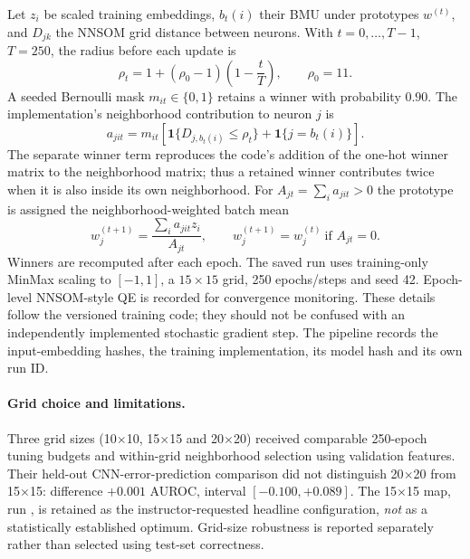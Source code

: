 \documentclass[11pt]{article}
\newcommand{\srcid}[1]{\texttt{\detokenize{#1}}}
\begin{document}
Let $z_i$ be scaled training embeddings, $b_t(i)$ their BMU under prototypes $w^{(t)}$, and $D_{jk}$ the NNSOM grid distance between neurons. With $t=0,\ldots,T-1$, $T=250$, the radius before each update is
\begin{equation}\label{eq:radius}
 \rho_t=1+(\rho_0-1)\left(1-\frac{t}{T}\right),\qquad \rho_0=11.
\end{equation}
A seeded Bernoulli mask $m_{it}\in\{0,1\}$ retains a winner with probability $0.90$. The implementation's neighborhood contribution to neuron $j$ is
\begin{equation}\label{eq:batchmembership}
 a_{jit}=m_{it}\left[\mathbf1\{D_{j,b_t(i)}\leq\rho_t\}+\mathbf1\{j=b_t(i)\}\right].
\end{equation}
The separate winner term reproduces the code's addition of the one-hot winner matrix to the neighborhood matrix; thus a retained winner contributes twice when it is also inside its own neighborhood. For $A_{jt}=\sum_i a_{jit}>0$ the prototype is assigned the neighborhood-weighted batch mean
\begin{equation}\label{eq:somupdate}
 w_j^{(t+1)}=\frac{\sum_i a_{jit}z_i}{A_{jt}},
 \qquad w_j^{(t+1)}=w_j^{(t)}\ \text{if }A_{jt}=0.
\end{equation}
Winners are recomputed after each epoch. The saved run uses training-only MinMax scaling to $[-1,1]$, a $15\times15$ grid, 250 epochs/steps and seed 42. Epoch-level NNSOM-style QE is recorded for convergence monitoring. These details follow the versioned training code; they should not be confused with an independently implemented stochastic gradient step. The pipeline records the input-embedding hashes, the training implementation, its model hash and its own run ID.

\paragraph{Grid choice and limitations.}
Three grid sizes (10$\times$10, 15$\times$15 and 20$\times$20) received comparable 250-epoch tuning budgets and within-grid neighborhood selection using validation features. Their held-out CNN-error-prediction comparison did not distinguish 20$\times$20 from 15$\times$15: difference $+0.001$ AUROC, interval $[-0.100,+0.089]$. The 15$\times$15 map, run \srcid{som_15x15_nb11_ep250_s42_v2}, is retained as the instructor-requested headline configuration, \emph{not} as a statistically established optimum. Grid-size robustness is reported separately rather than selected using test-set correctness.
\end{document}
